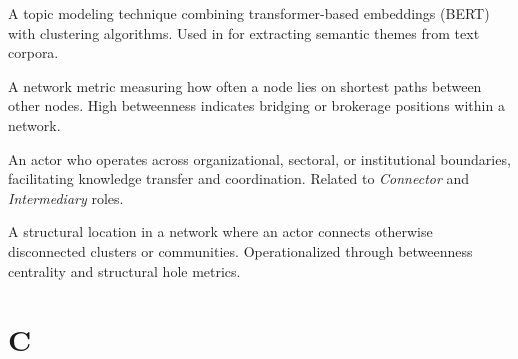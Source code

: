 \documentclass[../main.tex]{subfiles}
\begin{document}
\begin{description}[leftmargin=0.5cm, style=nextline]

\item[BERTopic] A topic modeling technique combining transformer-based embeddings (BERT) with clustering algorithms. Used in \RoleBox{} for extracting semantic themes from text corpora.

\item[Betweenness Centrality] A network metric measuring how often a node lies on shortest paths between other nodes. High betweenness indicates bridging or brokerage positions within a network.

\item[Boundary Spanner] An actor who operates across organizational, sectoral, or institutional boundaries, facilitating knowledge transfer and coordination. Related to \textit{Connector} and \textit{Intermediary} roles.

\item[Bridging Position] A structural location in a network where an actor connects otherwise disconnected clusters or communities. Operationalized through betweenness centrality and structural hole metrics.

\end{description}

\section*{C}
\end{document}
